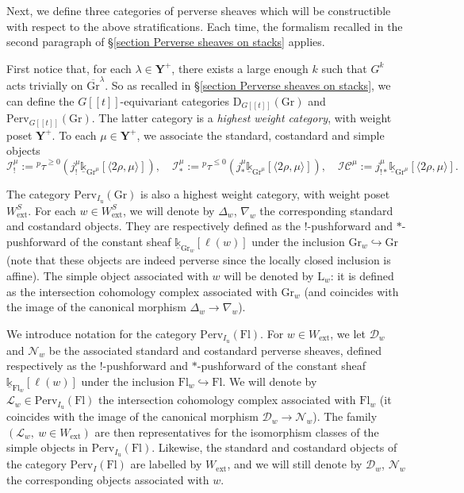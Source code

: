 \documentclass[11pt]{amsart}
\theoremstyle{plain}
\theoremstyle{remark}
\numberwithin{equation}{section}
\begin{document}
	Next, we define three categories of perverse sheaves which will be constructible with respect to the above stratifications. Each time, the formalism recalled in the second paragraph of §\ref{section Perverse sheaves on stacks} applies.
	
	First notice that, for each $\lambda\in \mathbf{Y}^+$, there exists a large enough $k$ such that $G^k$ acts trivially on $\overline{\mathrm{Gr}}^\lambda$. So as recalled in §\ref{section Perverse sheaves on stacks}, we can define the $G[[t]]$-equivariant categories $\mathrm{D}_{G[[t]]}(\mathrm{Gr})$ and $\mathrm{Perv}_{G[[t]]}(\mathrm{Gr})$. The latter category is a \textit{highest weight category}, with weight poset $\mathbf{Y}^+$. To each $\mu\in\mathbf{Y}^+$, we associate the standard, costandard and simple objects
	$$\mathcal{I}^\mu_!:={^p\tau}^{\geq0}(j^\mu_!\underline{\mathbb{k}}_{\mathrm{Gr}^\mu}[\langle2\rho,\mu\rangle]),\quad  \mathcal{I}^\mu_*:={^p\tau}^{\leq0}(j^\mu_*\underline{\mathbb{k}}_{\mathrm{Gr}^\mu}[\langle2\rho,\mu\rangle]),\quad \mathcal{IC}^\mu:=j^\mu_{!*}\underline{\mathbb{k}}_{\mathrm{Gr}^\mu}[\langle2\rho,\mu\rangle].$$
	
	The category $\mathrm{Perv}_{I_\mathrm{u}}(\mathrm{Gr})$ is also a highest weight category, with weight poset $W^S_\mathrm{ext}$. For each $w\in W^S_\mathrm{ext}$, we will denote by $\Delta_{w}$, $\nabla_{w}$ the corresponding standard and costandard objects. They are respectively defined as the $!$-pushforward and  $*$-pushforward of the constant sheaf $\underline{\mathbb{k}}_{\mathrm{Gr}_w}[\ell(w)]$ under the inclusion $\mathrm{Gr}_w\hookrightarrow\mathrm{Gr}$ (note that these objects are indeed perverse since the locally closed inclusion is affine). The simple object associated with $w$ will be denoted by $\mathrm{L}_w$: it is defined as the intersection cohomology complex associated with $\mathrm{Gr}_w$ (and coincides with the image of the canonical morphism $\Delta_{w}\to\nabla_{w}$).
	
	We introduce notation for the category $\mathrm{Perv}_{I_\mathrm{u}}(\mathrm{Fl})$. For $w\in W_\mathrm{ext}$, we let $\mathcal{D}_w$ and $\mathcal{N}_w$ be the associated standard and costandard perverse sheaves, defined respectively as the $!$-pushforward and  $*$-pushforward of the constant sheaf $\underline{\mathbb{k}}_{\mathrm{Fl}_w}[\ell(w)]$ under the inclusion $\mathrm{Fl}_w\hookrightarrow\mathrm{Fl}$. We will denote by $\mathcal{L}_w\in \mathrm{Perv}_{I_\mathrm{u}}(\mathrm{Fl})$ the intersection cohomology complex associated with $\mathrm{Fl}_w$ (it coincides with the image of the canonical morphism $\mathcal{D}_w\to \mathcal{N}_w$). The family $(\mathcal{L}_w,~w\in W_\mathrm{ext})$ are then representatives for the isomorphism classes of the simple objects in $\mathrm{Perv}_{I_\mathrm{u}}(\mathrm{Fl})$. Likewise, the standard and costandard objects of the category $\mathrm{Perv}_{I}(\mathrm{Fl})$ are labelled by $W_\mathrm{ext}$, and we will still denote by $\mathcal{D}_w$, $\mathcal{N}_w$ the corresponding objects associated with $w$.
\end{document}
